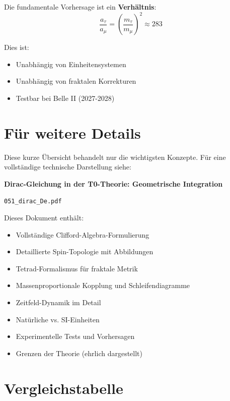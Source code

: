 	Die fundamentale Vorhersage ist ein \textbf{Verhältnis}:
	\begin{equation}
		\boxed{\frac{a_\tau}{a_\mu} = \left(\frac{m_\tau}{m_\mu}\right)^2 \approx 283}
	\end{equation}
	
	Dies ist:
	\begin{itemize}
		\item Unabhängig von Einheitensystemen
		\item Unabhängig von fraktalen Korrekturen
		\item Testbar bei Belle II (2027-2028)
	\end{itemize}
	
	\section{Für weitere Details}
	
	Diese kurze Übersicht behandelt nur die wichtigsten Konzepte. Für eine vollständige 
	technische Darstellung siehe:
	
	\begin{tcolorbox}[colback=blue!5!white,colframe=blue!75!black,title=Hauptdokument]
		\textbf{Dirac-Gleichung in der T0-Theorie: Geometrische Integration}
		
		\texttt{051\_dirac\_De.pdf}
		
		\vspace{0.3cm}
		
		Dieses Dokument enthält:
		\begin{itemize}
			\item Vollständige Clifford-Algebra-Formulierung
			\item Detaillierte Spin-Topologie mit Abbildungen
			\item Tetrad-Formalismus für fraktale Metrik
			\item Massenproportionale Kopplung und Schleifendiagramme
			\item Zeitfeld-Dynamik im Detail
			\item Natürliche vs. SI-Einheiten
			\item Experimentelle Tests und Vorhersagen
			\item Grenzen der Theorie (ehrlich dargestellt)
		\end{itemize}
	\end{tcolorbox}
	
	\section{Vergleichstabelle}
	
